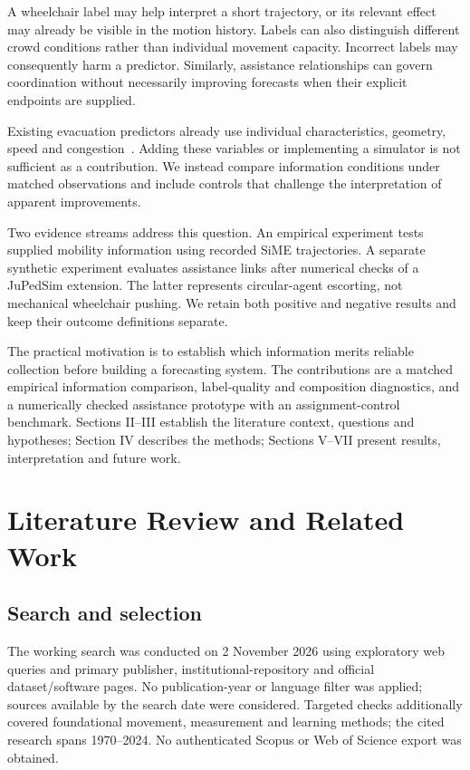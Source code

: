 \documentclass[conference]{IEEEtran}
\begin{document}
A wheelchair label may help interpret a short trajectory, or its relevant effect may already be visible in the motion history. Labels can also distinguish different crowd conditions rather than individual movement capacity. Incorrect labels may consequently harm a predictor. Similarly, assistance relationships can govern coordination without necessarily improving forecasts when their explicit endpoints are supplied.

Existing evacuation predictors already use individual characteristics, geometry, speed and congestion~\cite{deng,rset}. Adding these variables or implementing a simulator is not sufficient as a contribution. We instead compare information conditions under matched observations and include controls that challenge the interpretation of apparent improvements.

Two evidence streams address this question. An empirical experiment tests supplied mobility information using recorded SiME trajectories. A separate synthetic experiment evaluates assistance links after numerical checks of a JuPedSim extension. The latter represents circular-agent escorting, not mechanical wheelchair pushing. We retain both positive and negative results and keep their outcome definitions separate.

The practical motivation is to establish which information merits reliable collection before building a forecasting system. The contributions are a matched empirical information comparison, label-quality and composition diagnostics, and a numerically checked assistance prototype with an assignment-control benchmark. Sections II--III establish the literature context, questions and hypotheses; Section IV describes the methods; Sections V--VII present results, interpretation and future work.

\section{Literature Review and Related Work}
\subsection{Search and selection}
The working search was conducted on 2 November 2026 using exploratory web queries and primary publisher, institutional-repository and official dataset/software pages. No publication-year or language filter was applied; sources available by the search date were considered. Targeted checks additionally covered foundational movement, measurement and learning methods; the cited research spans 1970--2024. No authenticated Scopus or Web of Science export was obtained.
\end{document}
